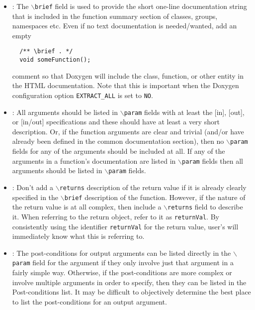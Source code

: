 \begin{itemize}
{}\item\DOXAddBrief: The {}\texttt{$\backslash$brief} field is used to provide
the short one-line documentation string that is included in the function
summary section of classes, groups, namespaces etc.  Even if no text
documentation is needed/wanted, add an empty
%
{\small\begin{verbatim}
  /** \brief . */
  void someFunction();
\end{verbatim}}
%
comment so that Doxygen will include the class, function, or other entity in
the HTML documentation.  Note that this is important when the Doxygen
configuration option {}\texttt{EXTRACT\-\_ALL} is set to {}\texttt{NO}.


{}\item\DOXAllOrNoneParam: All arguments should be listed in
{}\texttt{$\backslash$param} fields with at least the [in], [out], or [in/out]
specifications and these should have at least a very short description.  Or,
if the function arguments are clear and trivial (and/or have already been
defined in the common documentation section), then no
{}\texttt{$\backslash$param} fields for any of the arguments should be
included at all.  If any of the arguments in a function's documentation are
listed in {}\texttt{$\backslash$param} fields then all arguments should be
listed in {}\texttt{$\backslash$param} fields.


{}\item\DOXReturnsOnlyIfNeeded: Don't add a {}\texttt{$\backslash$returns}
description of the return value if it is already clearly specified in the
{}\texttt{$\backslash$brief} description of the function.  However, if the
nature of the return value is at all complex, then include a
{}\texttt{$\backslash$returns} field to describe it.  When referring to the
return object, refer to it as {}\texttt{returnVal}.  By consistently using the
identifier {}\texttt{returnVal} for the return value, user's will immediately
know what this is referring to.


{}\item\DOXPreferPostconditionsInParam: The post-conditions for output
arguments can be listed directly in the {}\texttt{$\backslash$param} field for
the argument if they only involve just that argument in a fairly simple way.
Otherwise, if the post-conditions are more complex or involve multiple
arguments in order to specify, then they can be listed in the Post-conditions
list.  It may be difficult to objectively determine the best place to list the
post-conditions for an output argument.



\end{itemize}
